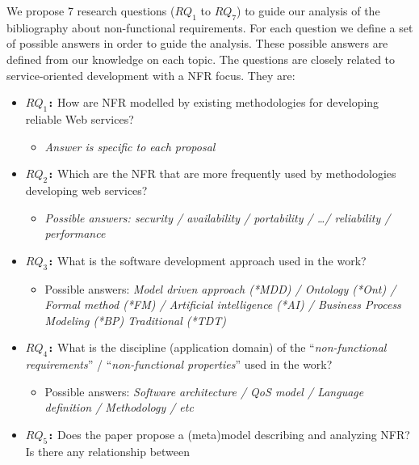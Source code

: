 % 

We propose 7 research questions ($RQ_1$ to $RQ_7$) to guide our analysis of the
bibliography about non-functional requirements. 
For each question we define a set of possible answers in order to guide
the analysis.
These possible answers are defined from our knowledge on each topic. 
The questions are closely related to service-oriented development with a NFR focus.
They are:
\begin{itemize} 
  \item \textbf{\texttt{$RQ_1$:}} How are NFR modelled by existing
  methodologies for developing reliable Web services?
  \begin{itemize}
	  \item \textit{Answer is specific to each proposal}
	\end{itemize}  
 \item \textbf{\texttt{$RQ_2$:}} Which are the NFR that are more frequently used
 by methodologies developing web services?
 	\begin{itemize}
	  \item \textit{Possible answers: security / availability / portability / \ldots / reliability /
	  performance}
	\end{itemize}
  \item \textbf{\texttt{$RQ_3$:}} What is the software
  development approach used in the work?
	\begin{itemize}
	  \item Possible answers: \textit{Model driven approach (*MDD) / Ontology (*Ont) / Formal method
	  (*FM) / Artificial intelligence (*AI) / Business Process Modeling (*BP)
	  Traditional (*TDT)}
	\end{itemize} 
  \item \textbf{\texttt{$RQ_4$:}} What is the discipline (application domain)
  of the ``\textit{non-functional requirements}'' / ``\textit{non-functional
  properties}'' used in the work?
  \begin{itemize}
	  \item Possible answers: \textit{Software architecture / QoS model / Language definition /
	  Methodology / etc}
	\end{itemize}	
  \item \textbf{\texttt{$RQ_5$:}} Does the paper propose a (meta)model
  describing and analyzing NFR? Is there any relationship between

\end{itemize}
